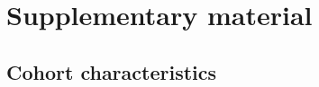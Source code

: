 \documentclass{article}
\begin{document}








% 
\printbibliography

\appendix

\section{Supplementary material}

\subsection{\label{appendix:sample_characteristics}Cohort characteristics}
\end{document}
